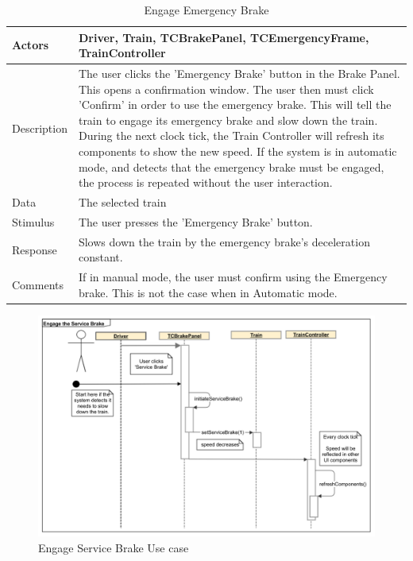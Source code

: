 \documentclass[]{article}
\begin{document}
\begin{table}[H]
	\centering
	\caption{Engage Emergency Brake}
	\begin{tabular}{|l|l|}
		\hline
		Actors & \parbox[t]{10cm}{Driver, Train, TCBrakePanel, TCEmergencyFrame, TrainController} \\ \hline
		Description & \parbox[t]{10cm}{The user clicks the 'Emergency Brake' button in the Brake Panel. This opens a confirmation window. The user then must click 'Confirm' in order to use the emergency brake. This will tell the train to engage its emergency brake and slow down the train. During the next clock tick, the Train Controller will refresh its components to show the new speed. If the system is in automatic mode, and detects that the emergency brake must be engaged, the process is repeated without the user interaction. } \\ \hline
		Data &  \parbox[t]{10cm}{The selected train} \\ \hline
		Stimulus &  \parbox[t]{10cm}{ The user presses the 'Emergency Brake' button. } \\ \hline
		Response & \parbox[t]{10cm}{Slows down the train by the emergency brake's deceleration constant. }\\ \hline
		Comments & \parbox[t]{10cm}{If in manual mode, the user must confirm using the Emergency brake. This is not the case when in Automatic mode.}  \\ \hline
	\end{tabular}
\end{table}

\begin{figure}[H]
	\centering
	\includegraphics[scale=.3]{tc_serviceBrake_usecase}
	\caption{Engage Service Brake Use case}
\end{figure}
\end{document}
